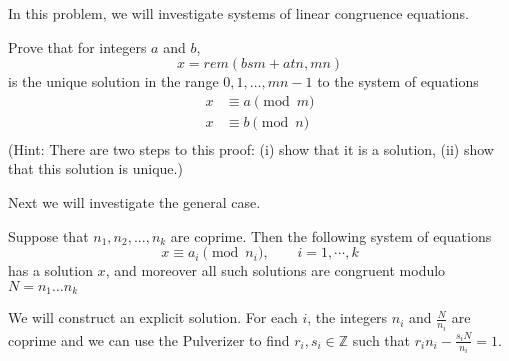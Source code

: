 \documentclass[12pt,twoside]{article}
\begin{document}
\begin{problem}{10} In this problem, we will investigate systems of linear congruence equations. 
\bparts

 Prove that for integers $a$ and $b$,
\[
    x = rem (bsm + atn, mn)
\]
is the unique solution in the range ${0, 1, \dots , mn - 1}$ to the system of equations
\begin{align}
    x &\equiv a \pmod{m} \\
    x &\equiv b \pmod{n} \\
\end{align}
(Hint: There are two steps to this proof: (i) show that it is a solution,
(ii) show that this solution is unique.)


 Next we will investigate the general case. 
\begin{theorem}
Suppose that $n_1, n_2, ..., n_k$ are coprime. Then the following system of equations
\[
    x \equiv a_i \pmod{n_i}, \qquad i = 1, \cdots, k
\]
has a solution $x$, and moreover all such solutions are congruent modulo $N = n_1 \dots n_k$
\end{theorem}
We will construct an explicit solution. For each $i$, the integers $n_i$ and $\frac{N}{n_i}$ are coprime and we can use the Pulverizer to find $r_i,s_i \in \mathbb{Z}$ such that $r_i n_i -  \frac{s_iN}{n_i} = 1$.


\end{problem}
\end{document}
